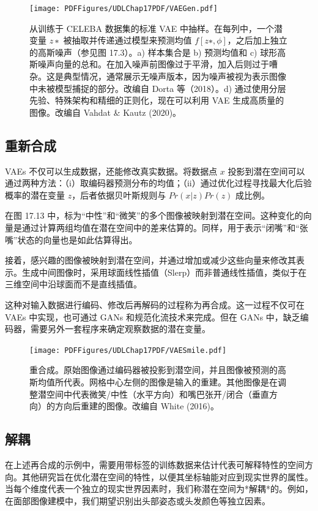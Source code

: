 \documentclass[lang=cn,newtx,10pt,scheme=chinese]{elegantbook}
\begin{document}
\begin{figure}[ht!]
\centering
\texttt{[image: PDFFigures/UDLChap17PDF/VAEGen.pdf]}
\caption{从训练于 CELEBA 数据集的标准 VAE 中抽样。在每列中，一个潜变量 \(z∗\) 被抽取并传递通过模型来预测均值 \(f[z∗, \phi]\)，之后加上独立的高斯噪声（参见图 17.3）。a) 样本集合是 b) 预测均值和 c) 球形高斯噪声向量的总和。在加入噪声前图像过于平滑，加入后则过于嘈杂。这是典型情况，通常展示无噪声版本，因为噪声被视为表示图像中未被模型捕捉的部分。改编自 Dorta 等（2018）。d) 通过使用分层先验、特殊架构和精细的正则化，现在可以利用 VAE 生成高质量的图像。改编自 Vahdat \& Kautz (2020)。}
\end{figure}


\subsection{重新合成}
VAEs 不仅可以生成数据，还能修改真实数据。将数据点 \(x\) 投影到潜在空间可以通过两种方法：（i）取编码器预测分布的均值；（ii）通过优化过程寻找最大化后验概率的潜在变量 \(z\)，后者依据贝叶斯规则与 \(Pr(x|z)Pr(z)\) 成比例。

在图 17.13 中，标为“中性”和“微笑”的多个图像被映射到潜在空间。这种变化的向量是通过计算两组均值在潜在空间中的差来估算的。同样，用于表示“闭嘴”和“张嘴”状态的向量也是如此估算得出。

接着，感兴趣的图像被映射到潜在空间，并通过增加或减少这些向量来修改其表示。生成中间图像时，采用球面线性插值（Slerp）而非普通线性插值，类似于在三维空间中沿球面而不是直线插值。

这种对输入数据进行编码、修改后再解码的过程称为再合成。这一过程不仅可在 VAEs 中实现，也可通过 GANs 和规范化流技术来完成。但在 GANs 中，缺乏编码器，需要另外一套程序来确定观察数据的潜在变量。

\begin{figure}[ht!]
\centering
\texttt{[image: PDFFigures/UDLChap17PDF/VAESmile.pdf]}
\caption{重合成。原始图像通过编码器被投影到潜空间，并且图像被预测的高斯均值所代表。网格中心左侧的图像是输入的重建。其他图像是在调整潜空间中代表微笑/中性（水平方向）和嘴巴张开/闭合（垂直方向）的方向后重建的图像。改编自 White (2016)。}
\end{figure}


\subsection{解耦}
在上述再合成的示例中，需要用带标签的训练数据来估计代表可解释特性的空间方向。其他研究旨在优化潜在空间的特性，以便其坐标轴能对应到现实世界的属性。当每个维度代表一个独立的现实世界因素时，我们称潜在空间为*解耦*的。例如，在面部图像建模中，我们期望识别出头部姿态或头发颜色等独立因素。
\end{document}
